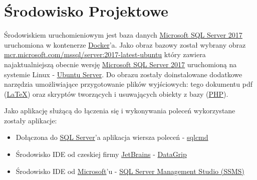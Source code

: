 \section{Środowisko Projektowe}

Środowiskiem uruchomieniowym jest baza danych \href{https://www.microsoft.com/pl-pl/sql-server/sql-server-2017}{Microsoft SQL Server 2017} uruchomiona w kontenerze \href{https://www.docker.com}{Docker}'a. Jako obraz bazowy został wybrany obraz \href{https://hub.docker.com/r/microsoft/mssql-server}{mcr.microsoft.com/mssql/server:2017-latest-ubuntu} który zawiera najaktualniejszą obecnie wersję \href{https://www.microsoft.com/pl-pl/sql-server/sql-server-2017}{Microsoft SQL Server 2017} uruchomioną na systemie Linux - \href{https://www.ubuntu.com/server}{Ubuntu Server}. Do obrazu zostały doinstalowane dodatkowe narzędzia umożliwiające przygotowanie plików wyjściowych: tego dokumentu pdf (\href{https://pl.wikipedia.org/wiki/LaTeX}{\LaTeX}) oraz skryptów tworzących i usuwających obiekty z bazy (\href{http://www.php.net}{PHP}).


Jako aplikację służącą do łączenia się i wykonywania poleceń wykorzystane zostały aplikacje: 

\begin{itemize}
\item Dołączona do \href{https://www.microsoft.com/pl-pl/sql-server/sql-server-2017}{SQL Server}'a aplikacja wiersza poleceń - \href{https://docs.microsoft.com/en-us/sql/tools/sqlcmd-utility?view=sql-server-2017}{sqlcmd}
\item Środowisko IDE od czeskiej firmy \href{https://www.jetbrains.com/}{JetBrains} - \href{https://www.jetbrains.com/datagrip/}{DataGrip}
\item Środowisko IDE od \href{https://microsoft.com/}{Microsoft}'u - \href{https://docs.microsoft.com/en-us/sql/ssms/download-sql-server-management-studio-ssms?view=sql-server-2017}{SQL Server Management Studio (SSMS)}
\end{itemize}